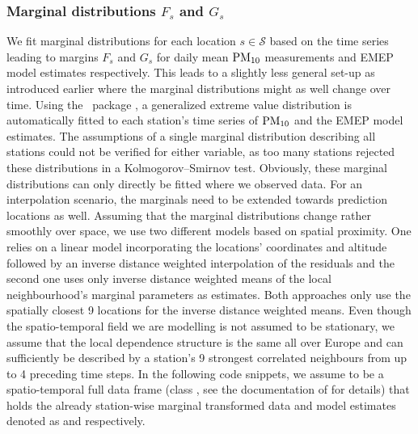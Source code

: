 \documentclass[article,nojss]{jss}
\begin{document}
\subsubsection*{Marginal distributions $F_{s}$ and $G_{s}$}
We fit marginal distributions for each location $s\in\mathcal{S}$ based on the time series leading to margins $F_s$ and $G_s$ for daily mean $\rm{PM}_{10}$ measurements and EMEP model estimates respectively. This leads to a slightly less general set-up as introduced earlier where the marginal distributions might as well change over time. Using the  ~package \citep{Stephenson2002}, a generalized extreme value distribution is automatically fitted to each station's time series of $\rm{PM}_{10}$ and the EMEP model estimates. The assumptions of a single marginal distribution describing all stations could not be verified for either variable, as too many stations rejected these distributions in a Kolmogorov–Smirnov test. Obviously, these marginal distributions can only directly be fitted where we observed data. For an interpolation scenario, the marginals need to be extended towards prediction locations as well. Assuming that the marginal distributions change rather smoothly over space, we use two different models based on spatial proximity. One relies on a linear model incorporating the locations' coordinates and altitude followed by an inverse distance weighted interpolation of the residuals and the second one uses only inverse distance weighted means of the local neighbourhood's marginal parameters as estimates. Both approaches only use the spatially closest 9 locations for the inverse distance weighted means. Even though the spatio-temporal field we are modelling is not assumed to be stationary, we assume that the local dependence structure is the same all over Europe and can sufficiently be described by a station's 9 strongest correlated neighbours from up to 4 preceding time steps. In the following code snippets, we assume  to be a spatio-temporal full data frame (class , see the documentation of  \citep{Pebesma2012} for details) that holds the already station-wise marginal transformed data and model estimates denoted as  and  respectively.
\end{document}
